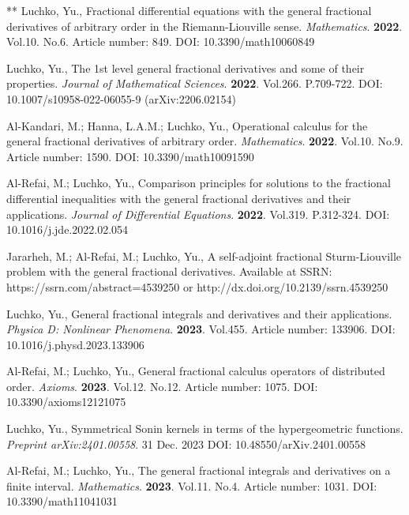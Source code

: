 \documentclass[12pt]{article}
\begin{document}
\begin{thebibliography}{**}
 Luchko, Yu., 
Fractional differential equations with the general fractional derivatives of arbitrary order in the Riemann-Liouville sense.
\textit{Mathematics}. 
\textbf{2022}. Vol.10. No.6. Article number: 849.
DOI: 10.3390/math10060849

 Luchko, Yu., 
The 1st level general fractional derivatives and some of their properties.
\textit{Journal of Mathematical Sciences}. 
\textbf{2022}. Vol.266. P.709-722.
DOI: 10.1007/s10958-022-06055-9 (arXiv:2206.02154)

 Al-Kandari, M.; Hanna, L.A.M.; Luchko, Yu., 
Operational calculus for the general fractional derivatives of arbitrary order.
\textit{Mathematics}. 
\textbf{2022}. Vol.10. No.9. Article number: 1590.
DOI: 10.3390/math10091590

 Al-Refai, M.; Luchko, Yu.,
Comparison principles for solutions to the fractional differential inequalities 
with the general fractional derivatives and their applications. 
\textit{Journal of Differential Equations}. 
\textbf{2022}. Vol.319. P.312-324.
DOI: 10.1016/j.jde.2022.02.054

Jararheh, M.; Al-Refai, M.; Luchko, Yu.,
A self-adjoint fractional Sturm-Liouville problem with the general fractional derivatives.
Available at SSRN: 
https://ssrn.com/abstract=4539250 or http://dx.doi.org/10.2139/ssrn.4539250 

 Luchko, Yu.,
General fractional integrals and derivatives and their applications.
\textit{Physica D: Nonlinear Phenomena}.
\textbf{2023}. Vol.455. Article number: 133906. 
DOI: 10.1016/j.physd.2023.133906

 Al-Refai, M.; Luchko, Yu.,
General fractional calculus operators of distributed order. 
\textit{Axioms}. 
\textbf{2023}. Vol.12. No.12. Article number: 1075.
DOI: 10.3390/axioms12121075

 Luchko, Yu.,
Symmetrical Sonin kernels in terms of the hypergeometric functions.
\textit{Preprint arXiv:2401.00558}. 31 Dec. 2023 
DOI: 10.48550/arXiv.2401.00558

 Al-Refai, M.; Luchko, Yu.,
The general fractional integrals and derivatives on a finite interval.
\textit{Mathematics}. 
\textbf{2023}. Vol.11. No.4. Article number: 1031. 
DOI: 10.3390/math11041031 


\end{thebibliography}
\end{document}
